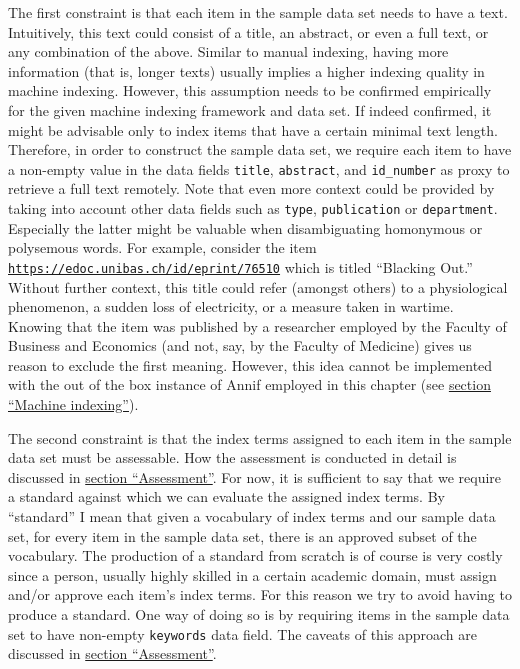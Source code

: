 The first constraint is that each item in the sample data set needs to
have a text. Intuitively, this text could consist of a title, an
abstract, or even a full text, or any combination of the above. Similar
to manual indexing, having more information (that is, longer texts)
usually implies a higher indexing quality in machine indexing. However,
this assumption needs to be confirmed empirically for the given machine
indexing framework and data set. If indeed confirmed, it might be
advisable only to index items that have a certain minimal text length.
Therefore, in order to construct the sample data set, we require each
item to have a non-empty value in the data fields \texttt{title},
\texttt{abstract}, and \texttt{id\_number} as proxy to retrieve a full
text remotely. Note that even more context could be provided by taking
into account other data fields such as \texttt{type},
\texttt{publication} or \texttt{department}. Especially the latter might
be valuable when disambiguating homonymous or polysemous words. For
example, consider the item
\href{https://edoc.unibas.ch/id/eprint/76510}{\texttt{https://edoc.unibas.ch/id/eprint/76510}}
which is titled ``Blacking Out.'' Without further context, this title
could refer (amongst others) to a physiological phenomenon, a sudden
loss of electricity, or a measure taken in wartime. Knowing that the
item was published by a researcher employed by the Faculty of Business
and Economics (and not, say, by the Faculty of Medicine) gives us reason
to exclude the first meaning. However, this idea cannot be implemented
with the out of the box instance of Annif employed in this chapter (see
\protect\hyperlink{machine-indexing}{section ``Machine indexing''}).

The second constraint is that the index terms assigned to each item in
the sample data set must be assessable. How the assessment is conducted
in detail is discussed in \protect\hyperlink{assessment}{section
``Assessment''}. For now, it is sufficient to say that we require a
standard against which we can evaluate the assigned index terms. By
``standard'' I mean that given a vocabulary of index terms and our
sample data set, for every item in the sample data set, there is an
approved subset of the vocabulary. The production of a standard from
scratch is of course is very costly since a person, usually highly
skilled in a certain academic domain, must assign and/or approve each
item's index terms. For this reason we try to avoid having to produce a
standard. One way of doing so is by requiring items in the sample data
set to have non-empty \texttt{keywords} data field. The caveats of this
approach are discussed in \protect\hyperlink{assessment}{section
``Assessment''}.

